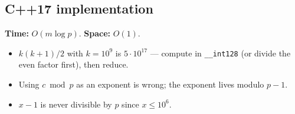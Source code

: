 
\subsection*{C++17 implementation}

\begin{complexitybox}
\textbf{Time:} $O(m\log p)$. \textbf{Space:} $O(1)$.
\end{complexitybox}

\begin{pitfallbox}
\begin{itemize}
  \item $k(k+1)/2$ with $k=10^9$ is $5\cdot10^{17}$ --- compute in
        \texttt{\_\_int128} (or divide the even factor first), then reduce.
  \item Using $c\bmod p$ as an exponent is wrong; the exponent lives modulo
        $p-1$.
  \item $x-1$ is never divisible by $p$ since $x\le10^6$.
\end{itemize}
\end{pitfallbox}

